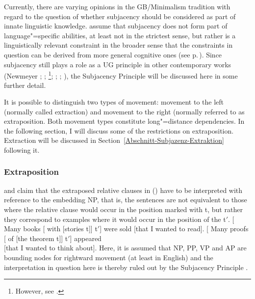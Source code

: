 Currently, there are varying opinions in the GB/Minimalism tradition with regard to the question of whether subjacency should be considered as part of innate linguistic knowledge.
\citet*{HCF2002a} assume that subjacency does not form part of language"=specific abilities, at least not in the strictest sense, but rather is a linguistically relevant constraint
in the broader sense that the constraints in question can be derived from more general cognitive ones (see
p.\,\pageref{Seite-Subjazenz-Performanz}). Since subjacency still plays a role as a UG principle in other contemporary works (Newmeyer \citeyear[, 74--75]{Newmeyer2005a};
\citeyear[]{Newmeyer2004b}; 
\citealp{Baltin2006a}\footnote{
However, see .
}; \citealp{Baker2009a}; \citealp{Freidin2009a}; \citealp{Rizzi2009a,Rizzi2009b}), 
the Subjacency Principle will be discussed here in some further detail.

It is possible to distinguish two types of movement: movement to the left (normally called extraction) and movement to the right (normally referred to as
extraposition. Both movement types constitute long"=distance dependencies.
In the following section, I will discuss some of the restrictions on extraposition. Extraction will be discussed in Section~\ref{Abschnitt-Subjazenz-Extraktion} following it.

\subsubsection{Extraposition}

\mbox{}\citet{Baltin81a} and \citet[]{Chomsky86b} claim that the extraposed relative clauses in () have to be interpreted with
reference to the embedding NP, that is, the sentences are not equivalent to those where the relative clause would occur in the position marked with t, but rather
they correspond to examples where it would occur in the position of the t$'$.
\eal
\label{ex-chomsky-sub}
\ex {}[ Many books [ with [stories t]] t$'$]  were sold [that I wanted to read].
\ex {}[ Many proofs [ of [the theorem t]] t$'$] appeared\\
    {}[that I wanted to think about].
\zl
Here, it is assumed that NP, PP, VP and AP are bounding nodes for rightward movement (at least in English) and the interpretation in question here
is thereby ruled out by the Subjacency Principle \citep[]{Baltin81a}. 


